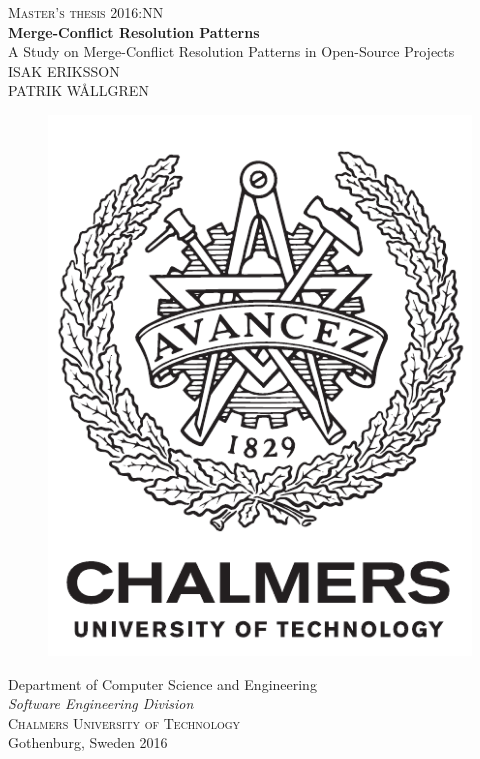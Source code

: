 \newpage
\thispagestyle{empty}
\begin{center}
	\textsc{\large Master's thesis 2016:NN}\\[4cm]		%
	\textbf{\Large Merge-Conflict Resolution Patterns} \\[1cm]
	{\large A Study on Merge-Conflict Resolution Patterns in Open-Source Projects}\\[1cm]
	{\large ISAK ERIKSSON\\PATRIK WÅLLGREN}
	
	\vfill	
	\begin{figure}[H]
	\centering
	\includegraphics[width=0.2\pdfpagewidth]{figure/auxiliary/logo_eng.pdf} \\	
	\end{figure}	\vspace{5mm}	
	
	Department of Computer Science and Engineering \\
	\emph{Software Engineering Division}\\
	\textsc{Chalmers University of Technology} \\
	Gothenburg, Sweden 2016 \\
\end{center}


